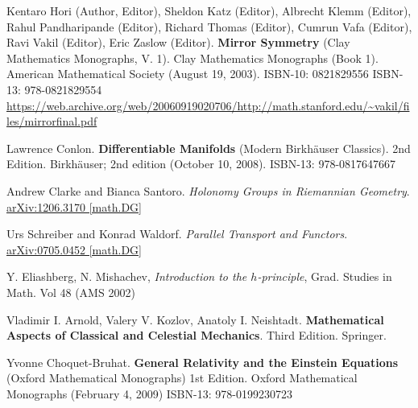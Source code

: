 \documentclass[10pt]{amsart}
\begin{document}
\begin{thebibliography}{9}
Kentaro Hori (Author, Editor), Sheldon Katz (Editor), Albrecht Klemm (Editor), Rahul Pandharipande (Editor), Richard Thomas (Editor), Cumrun Vafa (Editor), Ravi Vakil (Editor), Eric Zaslow (Editor).  \textbf{Mirror Symmetry} (Clay Mathematics Monographs, V. 1).  Clay Mathematics Monographs (Book 1).  American Mathematical Society (August 19, 2003).  ISBN-10: 0821829556  ISBN-13: 978-0821829554  \url{https://web.archive.org/web/20060919020706/http://math.stanford.edu/~vakil/files/mirrorfinal.pdf}

Lawrence Conlon.  \textbf{Differentiable Manifolds} (Modern Birkhäuser Classics).  2nd Edition.  Birkhäuser; 2nd edition (October 10, 2008).  ISBN-13: 978-0817647667




Andrew Clarke and Bianca Santoro.  \emph{Holonomy Groups in Riemannian Geometry}.  \href{https://arxiv.org/pdf/1206.3170.pdf}{arXiv:1206.3170 [math.DG]}

Urs Schreiber and Konrad Waldorf.  \emph{Parallel Transport and Functors}.  \href{https://arxiv.org/pdf/0705.0452.pdf}{arXiv:0705.0452 [math.DG]}

Y. Eliashberg, N. Mishachev, \emph{Introduction to the $h$-principle}, Grad. Studies in Math. Vol 48 (AMS 2002)


Vladimir I. Arnold, Valery V. Kozlov, Anatoly I. Neishtadt.  \textbf{Mathematical Aspects of Classical and Celestial Mechanics}.  Third Edition.  Springer.  

Yvonne Choquet-Bruhat.  \textbf{General Relativity and the Einstein Equations} (Oxford Mathematical Monographs) 1st Edition.  Oxford Mathematical Monographs (February 4, 2009) ISBN-13: 978-0199230723


\end{thebibliography}
\end{document}
